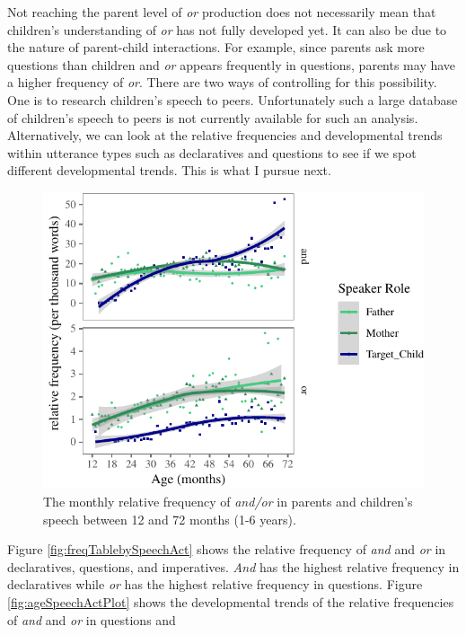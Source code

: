 \documentclass[oneside]{report}
\theoremstyle{definition}
\theoremstyle{definition}
\theoremstyle{definition}
\theoremstyle{remark}
\begin{document}
Not reaching the parent level of \emph{or} production does not
necessarily mean that children's understanding of \emph{or} has not
fully developed yet. It can also be due to the nature of parent-child
interactions. For example, since parents ask more questions than
children and \emph{or} appears frequently in questions, parents may have
a higher frequency of \emph{or}. There are two ways of controlling for
this possibility. One is to research children's speech to peers.
Unfortunately such a large database of children's speech to peers is not
currently available for such an analysis. Alternatively, we can look at
the relative frequencies and developmental trends within utterance types
such as declaratives and questions to see if we spot different
developmental trends. This is what I pursue next. \newline
\begin{figure}[tb]

{\centering \includegraphics{figs/agePlot-1} 

}

\caption{The monthly relative frequency of \textit{and/or} in parents and children's speech between 12 and 72 months (1-6 years).}\label{fig:agePlot}
\end{figure}
Figure \ref{fig:freqTablebySpeechAct} shows the relative frequency of
\emph{and} and \emph{or} in declaratives, questions, and imperatives.
\emph{And} has the highest relative frequency in declaratives while
\emph{or} has the highest relative frequency in questions. Figure
\ref{fig:ageSpeechActPlot} shows the developmental trends of the
relative frequencies of \emph{and} and \emph{or} in questions and
\end{document}
